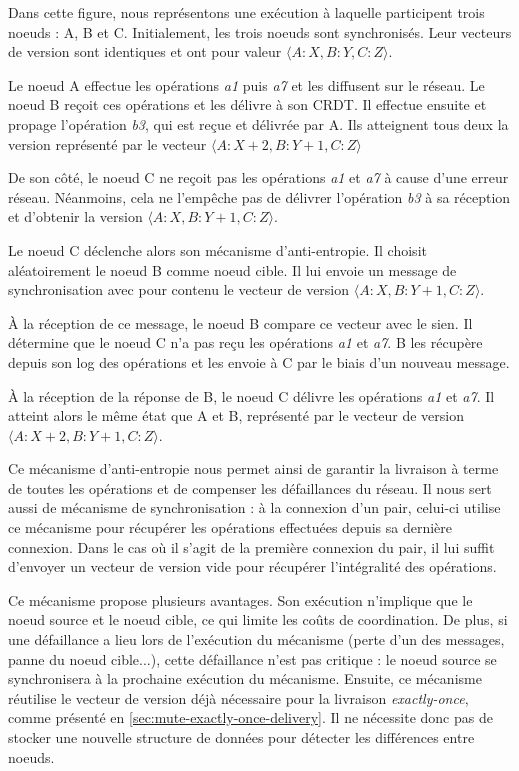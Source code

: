 \documentclass[12pt]{thesul}
\begin{document}

Dans cette figure, nous représentons une exécution à laquelle participent trois noeuds : A, B et C.
Initialement, les trois noeuds sont synchronisés.
Leur vecteurs de version sont identiques et ont pour valeur $\langle A:X,B:Y,C:Z \rangle$.

Le noeud A effectue les opérations \emph{a1} puis \emph{a7} et les diffusent sur le réseau.
Le noeud B reçoit ces opérations et les délivre à son \ac{CRDT}.
Il effectue ensuite et propage l'opération \emph{b3}, qui est reçue et délivrée par A.
Ils atteignent tous deux la version représenté par le vecteur $\langle A:X+2,B:Y+1,C:Z \rangle$

De son côté, le noeud C ne reçoit pas les opérations \emph{a1} et \emph{a7} à cause d'une erreur réseau.
Néanmoins, cela ne l'empêche pas de délivrer l'opération \emph{b3} à sa réception et d'obtenir la version $\langle A:X,B:Y+1,C:Z \rangle$.

Le noeud C déclenche alors son mécanisme d'anti-entropie.
Il choisit aléatoirement le noeud B comme noeud cible.
Il lui envoie un message de synchronisation avec pour contenu le vecteur de version $\langle A:X,B:Y+1,C:Z \rangle$.

À la réception de ce message, le noeud B compare ce vecteur avec le sien.
Il détermine que le noeud C n'a pas reçu les opérations \emph{a1} et \emph{a7}.
B les récupère depuis son log des opérations et les envoie à C par le biais d'un nouveau message.

À la réception de la réponse de B, le noeud C délivre les opérations \emph{a1} et \emph{a7}.
Il atteint alors le même état que A et B, représenté par le vecteur de version $\langle A:X+2,B:Y+1,C:Z \rangle$.

Ce mécanisme d'anti-entropie nous permet ainsi de garantir la livraison à terme de toutes les opérations et de compenser les défaillances du réseau.
Il nous sert aussi de mécanisme de synchronisation : à la connexion d'un pair, celui-ci utilise ce mécanisme pour récupérer les opérations effectuées depuis sa dernière connexion.
Dans le cas où il s'agit de la première connexion du pair, il lui suffit d'envoyer un vecteur de version vide pour récupérer l'intégralité des opérations.

Ce mécanisme propose plusieurs avantages.
Son exécution n'implique que le noeud source et le noeud cible, ce qui limite les coûts de coordination.
De plus, si une défaillance a lieu lors de l'exécution du mécanisme (perte d'un des messages, panne du noeud cible...), cette défaillance n'est pas critique : le noeud source se synchronisera à la prochaine exécution du mécanisme.
Ensuite, ce mécanisme réutilise le vecteur de version déjà nécessaire pour la livraison \emph{exactly-once}, comme présenté en \autoref{sec:mute-exactly-once-delivery}.
Il ne nécessite donc pas de stocker une nouvelle structure de données pour détecter les différences entre noeuds.
\end{document}
